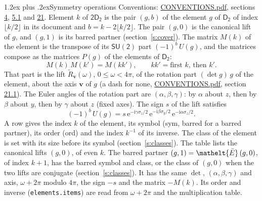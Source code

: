 \documentclass[10pt,a4paper]{article}
\makeatletter
\renewcommand\section{\@startsection{section}{1}{\z@}{-3ex plus -1ex minus -.2ex}%
  {1.2ex plus .2ex}{\normalfont\large\sffamily\bfseries\color{parttitle}}}
\numberwithin{equation}{section}
\newcommand{\eltfont}[1]{{\let\sigma\eltsigma\mathelt{#1}}}
\newcommand{\grp}[1]{\mathsf{#1}}
\newcommand{\elt}[1]{\eltfont{#1}}
\newcommand{\vv}{\mathbf{v}}
\newcommand{\iunit}{\mathrm{i}}
\newcommand{\expe}{\mathrm{e}}
\newcommand{\barred}[1]{\bar{#1}}
\newcommand{\lift}[1]{\tilde{#1}}
\newcommand{\pauli}[1]{\sigma_{#1}}
\makeatother
\begin{document}
\section{Symmetry operations}\label{s:elements}
Conventions: \href{../../CONVENTIONS.pdf}{CONVENTIONS.pdf}, sections \href{../../../rotation/CONVENTIONS.pdf\#conv.4}{4}, \href{../../../rotation/CONVENTIONS.pdf\#conv.5.1}{5.1} and \href{../../CONVENTIONS.pdf\#conv.21}{21}.
\leavevmode\label{n:index.element}\label{n:element.g}Element $k$ of $\grp{2D_{2}}$ is the pair $(g, b)$ of the element $g$ of \href{../../../rotation/data/pdf/D2.pdf}{$\grp{D_{2}}$} of index $\lfloor k/2\rfloor$ in its document and $b = k - 2\lfloor k/2\rfloor$. The pair $(g, 0)$ is the canonical lift of $g$, and $(g, 1)$ is its barred partner (section~\ref{s:cover}). \label{n:matrix.element.pin}\label{n:matrix.element}The matrix $M(k)$ of the element is the transpose of its $\grp{SU(2)}$ part $(-1)^{b}\,U(g)$, and the matrices compose as the matrices $P(g)$ of the elements of $\grp{D_{2}}$:
\begin{equation}\label{e:mprod}M(k)\,M(k') = M(kk'),\qquad kk' = \text{first } k\text{, then } k'.\end{equation}
\leavevmode\label{n:angle.omega}\label{n:vector.axis}\label{n:vector.pole}That part is the lift $\lift{R}_{\vv}(\omega)$, $0 \le \omega < 4\pi$, of the rotation part $(\det g)\,g$ of the element, about the axis $\vv$ of $g$ (a dash for none, \href{../../CONVENTIONS.pdf}{CONVENTIONS.pdf}, section \href{../../CONVENTIONS.pdf\#conv.21.1}{21.1}). \label{n:angle.euler.alpha}\label{n:angle.euler.beta}\label{n:angle.euler.gamma}\label{n:vector.coordinates}The Euler angles of the rotation part are $(\alpha,\beta,\gamma)$: by $\alpha$ about $z$, then by $\beta$ about $y$, then by $\gamma$ about $z$ (fixed axes). \label{n:local.euler.sign}The sign $s$ of the lift satisfies
\begin{equation}\label{e:euler}(-1)^{b}\,U(g) = s\,\expe^{-\iunit\gamma\pauli{z}/2}\,\expe^{-\iunit\beta\pauli{y}/2}\,\expe^{-\iunit\alpha\pauli{z}/2}.\end{equation}
\leavevmode\label{n:index.element.inverse}\label{n:head.sym}\label{n:head.ord}A row gives the index $k$ of the element, its symbol (sym, barred for a barred partner), its order (ord) and the index $k^{-1}$ of its inverse. \label{n:head.class}The class of the element is set with its size before its symbol (section~\ref{s:classes}).
The table lists the canonical lifts $(g, 0)$, of even $k$. The barred partner $(g, 1) = \elt{\barred{E}}\,(g, 0)$, of index $k + 1$, has the barred symbol and class, or the class of $(g, 0)$ when the two lifts are conjugate (section~\ref{s:classes}). It has the same $\det$, $(\alpha,\beta,\gamma)$ and axis, $\omega + 2\pi$ modulo $4\pi$, the sign $-s$ and the matrix $-M(k)$. Its order and inverse (\texttt{elements.items}) are read from $\omega + 2\pi$ and the multiplication table.
\end{document}
